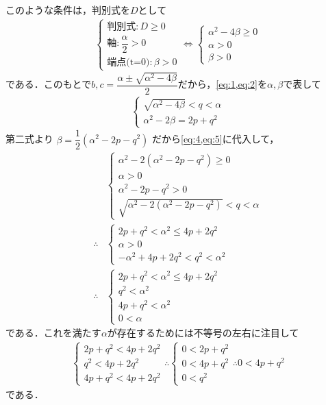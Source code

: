 \documentclass[../../main.tex]{subfiles}
\begin{document}
このような条件は，判別式を$D$として
\begin{align}
  \begin{cases}
    \text{判別式}: D \ge 0 \\
    \text{軸}: \dfrac{\alpha}{2} > 0 \\
    \text{端点(t=0)}: \beta > 0
  \end{cases} \iff
  \begin{cases}
    \alpha^2 - 4\beta \ge 0  \\
    \alpha > 0 \\
    \beta > 0
  \end{cases} \label{eq:4}
\end{align}
である．このもとで$b,c = \dfrac{\alpha\pm \sqrt{\alpha^2-4\beta}}{2}$だから，\cref{eq:1,eq:2}を$\alpha,\beta$で表して
\begin{align}
  \begin{cases}
    \sqrt{\alpha^2-4\beta} < q < \alpha \\
    \alpha^2 - 2\beta = 2p + q^2
  \end{cases} \label{eq:5}
\end{align}
第二式より $\beta = \dfrac{1}{2}(\alpha^2 - 2p - q^2)$ だから\cref{eq:4,eq:5}に代入して，
\begin{align}
  &
  \begin{cases}
    \alpha^2 - 2(\alpha^2 - 2p - q^2) \ge 0  \\
    \alpha > 0 \\
    \alpha^2 - 2p - q^2 > 0 \\
    \sqrt{\alpha^2-2(\alpha^2 - 2p - q^2)} < q < \alpha
  \end{cases} \\
  \therefore
  &
  \begin{cases}
    2p+q^2 < \alpha^2 \le 4p + 2q^2 \\
    \alpha > 0 \\
    -\alpha^2 + 4p + 2q^2 < q^2 < \alpha^2
  \end{cases} \\
  \therefore
  &
  \begin{cases}
    2p+q^2 < \alpha^2 \le 4p + 2q^2 \\
    q^2 < \alpha^2 \\
    4p + q^2 < \alpha^2 \\
    0 < \alpha
  \end{cases} \label{eq:6}
\end{align}
である．これを満たす$\alpha$が存在するためには不等号の左右に注目して
\begin{align}
  \begin{cases}
    2p+q^2 <  4p + 2q^2 \\
    q^2 < 4p + 2q^2 \\
    4p + q^2 < 4p + 2q^2
  \end{cases}
  \therefore
  \begin{cases}
    0 < 2p + q^2 \\
    0 < 4p + q^2 \\
    0 < q^2
  \end{cases}
  \therefore
  0 < 4p + q^2 \label{eq:7}
\end{align}
である．
\end{document}
